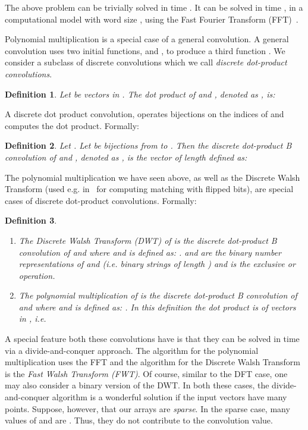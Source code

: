 \documentclass[11pt,amssymb]{article}
\newtheorem{definition}{Definition}
\begin{document}
The above problem can be trivially solved in time . It can be
solved in time , in a computational model with word size
, using the Fast Fourier Transform (FFT)~\cite{CLR-92}.

Polynomial multiplication is a special case of a general convolution. 
A general convolution uses two initial functions,  and , to
produce a third function . We consider a subclass of discrete
convolutions which we call {\em discrete dot-product convolutions}.

\begin{definition}\label{d:dot}
Let  be vectors in
. The {\em dot product} of  and , denoted as
, is: 

\end{definition}

A discrete dot product convolution, operates  bijections on the
indices of  and computes the dot product. Formally:

\begin{definition}\label{d:ddpt}
Let . Let  be bijections from  to
.
Then the {\em discrete dot-product B convolution of  and },
denoted as , is the vector of length  defined as:
 
\end{definition}

The polynomial multiplication we have seen above, as well as the
Discrete Walsh Transform (used e.g. in~\cite{aalp07} for computing
matching with flipped bits), are special cases of discrete dot-product
convolutions. Formally:

\begin{definition}\label{d:2dts}
\begin{enumerate}
\item The {\em Discrete Walsh Transform (DWT)} of  is the {\em discrete dot-product B convolution of 
and } where   and
 is defined as:
.  and  are the binary number
representations of  and  (i.e. binary strings of length )
and  is the {\em exclusive or} operation.
\item The {\em polynomial multiplication} of  is the {\em discrete dot-product B
convolution of  and } where   and
 is defined as:
. In this definition the dot product is of vectors
  in , i.e.   
\end{enumerate}
\end{definition}

A special feature both these convolutions have is that they can be
solved in time  via a divide-and-conquer approach. The
algorithm for the polynomial multiplication uses the FFT and the
algorithm for the Discrete Walsh Transform is the {\em Fast Walsh
Transform (FWT)}. Of course, similar to the DFT case, one may also 
consider a binary version of the DWT. In both
these cases, the  divide-and-conquer algorithm is a
wonderful solution if the input vectors have many points. Suppose,
however, that our arrays are {\em sparse}. In the sparse case, many
values of  and  are . Thus, they do not contribute to the
convolution value. 
\end{document}
